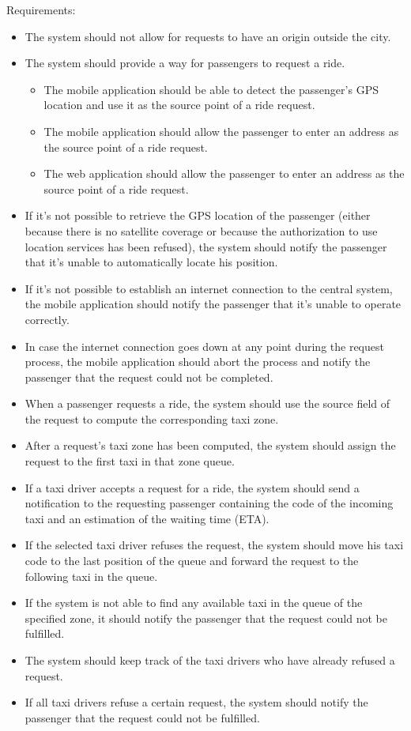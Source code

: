 Requirements:
\begin{itemize}
\item The system should not allow for requests to have an origin outside the city. 
\item The system should provide a way for passengers to request a ride.
\begin{itemize}
\item The mobile application should be able to detect the passenger's GPS location and use it as the source point of a ride request.
\item The mobile application should allow the passenger to enter an address as the source point of a ride request.
\item The web application should allow the passenger to enter an address as the source point of a ride request.
\end{itemize}
\item If it's not possible to retrieve the GPS location of the passenger (either because there is no satellite coverage or because the authorization to use location services has been refused), the system should notify the passenger that it's unable to automatically locate his position.
\item If it's not possible to establish an internet connection to the central system, the mobile application should notify the passenger that it's unable to operate correctly.
\item In case the internet connection goes down at any point during the request process, the mobile application should abort the process and notify the passenger that the request could not be completed.
\item When a passenger requests a ride, the system should use the source field of the request to compute the corresponding taxi zone.
\item After a request's taxi zone has been computed, the system should assign the request to the first taxi in that zone queue.
\item If a taxi driver accepts a request for a ride, the system should send a notification to the requesting passenger containing the code of the incoming taxi and an estimation of the waiting time (ETA).
\item If the selected taxi driver refuses the request, the system should move his taxi code to the last position of the queue and forward the request to the following taxi in the queue.
\item If the system is not able to find any available taxi in the queue of the specified zone, it should notify the passenger that the request could not be fulfilled. 
\item The system should keep track of the taxi drivers who have already refused a request.
\item If all taxi drivers refuse a certain request, the system should notify the passenger that the request could not be fulfilled.
\end{itemize}


